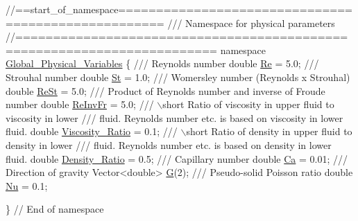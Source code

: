  
\begin{DoxyCodeInclude}
\textcolor{comment}{//==start\_of\_namespace====================================================}
\textcolor{comment}{/// Namespace for physical parameters}
\textcolor{comment}{}\textcolor{comment}{//========================================================================}
\textcolor{keyword}{namespace }\hyperlink{namespaceGlobal__Physical__Variables}{Global\_Physical\_Variables}
\{
\textcolor{comment}{}
\textcolor{comment}{ /// Reynolds number}
\textcolor{comment}{} \textcolor{keywordtype}{double} \hyperlink{namespaceGlobal__Physical__Variables_ab814e627d2eb5bc50318879d19ab16b9}{Re} = 5.0;
\textcolor{comment}{}
\textcolor{comment}{ /// Strouhal number}
\textcolor{comment}{} \textcolor{keywordtype}{double} \hyperlink{namespaceGlobal__Physical__Variables_a4b6ef72bd221361c37f5b9a4a6899afc}{St} = 1.0;
\textcolor{comment}{}
\textcolor{comment}{ /// Womersley number (Reynolds x Strouhal)}
\textcolor{comment}{} \textcolor{keywordtype}{double} \hyperlink{namespaceGlobal__Physical__Variables_a085ee4bf968ffdd01a41b8c41864f907}{ReSt} = 5.0;
 \textcolor{comment}{}
\textcolor{comment}{ /// Product of Reynolds number and inverse of Froude number}
\textcolor{comment}{} \textcolor{keywordtype}{double} \hyperlink{namespaceGlobal__Physical__Variables_aa6286f02b476912dd7550eced538331a}{ReInvFr} = 5.0;
\textcolor{comment}{}
\textcolor{comment}{ /// \(\backslash\)short Ratio of viscosity in upper fluid to viscosity in lower}
\textcolor{comment}{ /// fluid. Reynolds number etc. is based on viscosity in lower fluid.}
\textcolor{comment}{} \textcolor{keywordtype}{double} \hyperlink{namespaceGlobal__Physical__Variables_adb51428300a01b19395c43c0d3586d6f}{Viscosity\_Ratio} = 0.1;
\textcolor{comment}{}
\textcolor{comment}{ /// \(\backslash\)short Ratio of density in upper fluid to density in lower}
\textcolor{comment}{ /// fluid. Reynolds number etc. is based on density in lower fluid.}
\textcolor{comment}{} \textcolor{keywordtype}{double} \hyperlink{namespaceGlobal__Physical__Variables_a80a34b6dfb7e1501966b8d6c7501e718}{Density\_Ratio} = 0.5;
\textcolor{comment}{}
\textcolor{comment}{ /// Capillary number}
\textcolor{comment}{} \textcolor{keywordtype}{double} \hyperlink{namespaceGlobal__Physical__Variables_a8b32b93d2e546f9375ec418474107838}{Ca} = 0.01;
\textcolor{comment}{}
\textcolor{comment}{ /// Direction of gravity}
\textcolor{comment}{} Vector<double> \hyperlink{namespaceGlobal__Physical__Variables_a37a6f46efcb35b4bd12c73f19d741020}{G}(2);
\textcolor{comment}{}
\textcolor{comment}{ /// Pseudo-solid Poisson ratio}
\textcolor{comment}{} \textcolor{keywordtype}{double} \hyperlink{namespaceGlobal__Physical__Variables_a3962c36313826b19f216f6bbbdd6a477}{Nu} = 0.1;

\} \textcolor{comment}{// End of namespace}

\end{DoxyCodeInclude}




